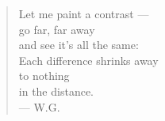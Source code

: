 \begin{verse}
Let me paint a contrast --- \\
go far, far away \\
and see it's all the same: \\
Each difference shrinks away \\
to nothing \\
in the distance. \\
--- W.G.
\end{verse}

